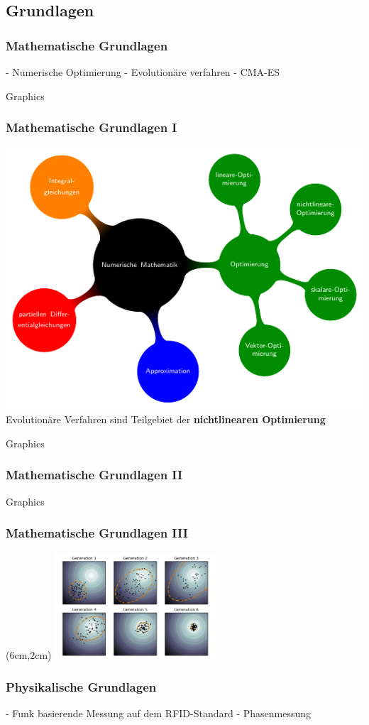 \subsection{Grundlagen}
\begin{frame} %
  \frametitle{Mathematische Grundlagen}
  	- Numerische Optimierung
	- Evolutionäre verfahren
	- CMA-ES
\end{frame}
\begin{frame}{Graphics} 
	\frametitle{Mathematische Grundlagen I }
	\centering
	\includegraphics[page=1, width=.6\textwidth]{../img/mindmap.pdf}\\
	\tiny Evolutionäre Verfahren sind Teilgebiet der \textbf{nichtlinearen Optimierung}
\end{frame}
\begin{frame}{Graphics} 
  	\frametitle{Mathematische Grundlagen II}

\end{frame}
\begin{frame}{Graphics} 
  	\frametitle{Mathematische Grundlagen III}
%  	
  	\begin{textblock*}{6cm}(6cm,2cm) %
  		\includegraphics[width=6cm]{../img/Concept_of_directional_optimization_in_CMA-ES_algorithm.png}
  	\end{textblock*}
%  	
\end{frame}
\begin{frame}
  \frametitle{Physikalische Grundlagen}
	- Funk basierende Messung auf dem RFID-Standard 
	- Phasenmessung
\end{frame}
